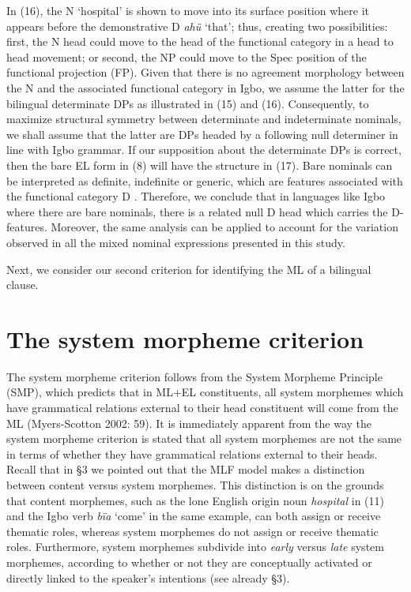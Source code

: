 \documentclass[output=paper]{langsci/langscibook}
\begin{document}
In (16), the N ‘hospital’ is shown to move into its surface position where it appears before the demonstrative D \textit{ahü }‘that’; thus, creating two possibilities: first, the N head could move to the head of the functional category in a head to head movement; or second, the NP could move to the Spec position of the functional projection (FP). Given that there is no agreement morphology between the N and the associated functional category in Igbo, we assume the latter for the bilingual determinate DPs as illustrated in (15) and (16). Consequently, to maximize structural symmetry between determinate and indeterminate nominals, we shall assume that the latter are DPs headed by a following null determiner in line with Igbo grammar. If our supposition about the determinate DPs is correct, then the bare EL form in (8) will have the structure in (17). Bare nominals can be interpreted as definite, indefinite or generic, which are features associated with the functional category D \citep{Radford2004}. Therefore, we conclude that in languages like Igbo where there are bare nominals, there is a related null D head which carries the D-features. Moreover, the same analysis can be applied to account for the variation observed in all the mixed nominal expressions presented in this study. 

Next, we consider our second criterion for identifying the ML of a bilingual clause.

\section{The system morpheme criterion}

The system morpheme criterion follows from the System Morpheme Principle (SMP), which predicts that in ML+EL constituents, all system morphemes which have grammatical relations external to their head constituent will come from the ML (Myers-Scotton 2002: 59). It is immediately apparent from the way the system morpheme criterion is stated that all system morphemes are not the same in terms of whether they have grammatical relations external to their heads. Recall that in §3 we pointed out that the MLF model makes a distinction between content versus system morphemes. This distinction is on the grounds that content morphemes, such as the lone English origin noun \textit{hospital }in (11) and the Igbo verb \textit{bïa }‘come’ in the same example, can both assign or receive thematic roles, whereas system morphemes do not assign or receive thematic roles. Furthermore, system morphemes subdivide into \textit{early} versus \textit{late} system morphemes, according to whether or not they are conceptually activated or directly linked to the speaker’s intentions (see already §3). 
\end{document}

